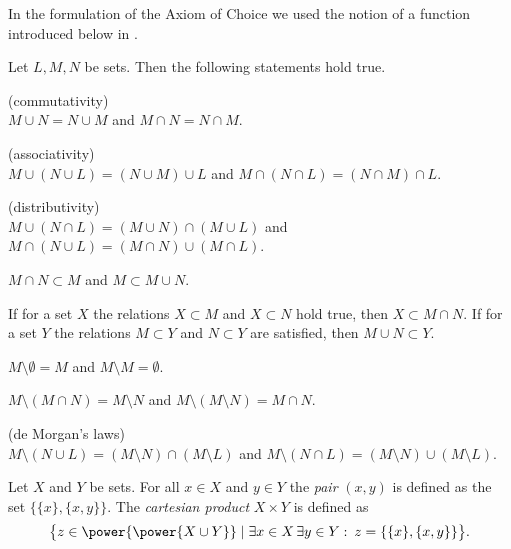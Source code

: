 \begin{remark}
  In the formulation of the Axiom of Choice we used the notion of a function introduced below in
  .
\end{remark}

\begin{proposition}
  Let $L, M, N$ be sets. Then the following statements hold true. 
  \begin{letterlist}
  \item \textup{\sffamily (commutativity)}\\ $M \cup N = N \cup M$ and   $M \cap N = N \cap M$.
  \item \textup{(\sffamily associativity)}\\ $M \cup (N \cup L)  = (N \cup M) \cup L$ and   
                                 $M \cap (N  \cap L) = (N \cap M) \cap L$.
  \item \textup{\sffamily (distributivity)} \\
      $M \cup (N \cap L)  = (M \cup N) \cap (M \cup L)$ and   
      $M \cap (N \cup L)  = (M \cap N) \cup (M \cap L)$.
  \item $ M \cap N \subset M$ and $M\subset M \cup N$.
  \item If for a set $X$ the relations $X \subset M$ and $X \subset N$ hold true, then $X \subset M \cap N$.
     If for a set $Y$ the relations $M \subset Y$ and $N \subset Y$ are satisfied, then $M \cup N \subset Y $.
  \item $M \setminus \emptyset = M $ and $M \setminus M = \emptyset$.
  \item $ M \setminus (M \cap N) = M \setminus N  $ and $ M \setminus (M  \setminus N) = M \cap N$. 
  \item \textup{\sffamily (de Morgan's laws)}\\
      $M \setminus (N \cup L)  = (M \setminus N) \cap (M \setminus L)  $ and 
      $M \setminus (N \cap L)  = (M \setminus N) \cup (M \setminus L)  $.
  \end{letterlist}
\end{proposition}


\begin{definition}
  Let $X$ and $Y$ be sets. For all $x\in X$ and $y\in Y$ the \emph{pair} $(x,y)$ is defined as
  the set $\big\{ \{x \}, \{ x, y \} \big\}$. The \emph{cartesian product}
  $X \times Y$ is defined as 
  \[
    \big\{ z \in \power{\power{X \cup Y}} \mid \exists x \in X \, \exists y \in Y : \: 
    z = \{ \{x \}, \{ x, y \}\} \big\}  .
  \]
\end{definition}

